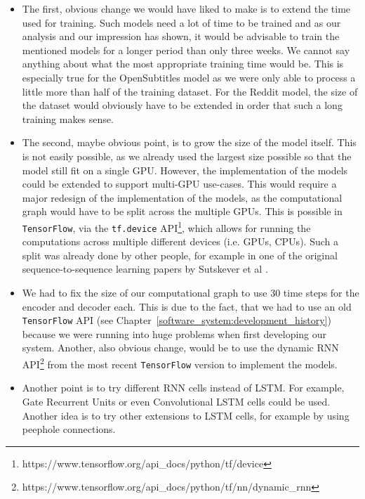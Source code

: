 \begin{itemize}
  \item The first, obvious change we would have liked to make is to extend the time used for training. Such models need a lot of time to be trained and as our analysis and our impression has shown, it would be advisable to train the mentioned models for a longer period than only three weeks. We cannot say anything about what the most appropriate training time would be. This is especially true for the OpenSubtitles model as we were only able to process a little more than half of the training dataset. For the Reddit model, the size of the dataset would obviously have to be extended in order that such a long training makes sense.
  
  \item The second, maybe obvious point, is to grow the size of the model itself. This is not easily possible, as we already used the largest size possible so that the model still fit on a single GPU. However, the implementation of the models could be extended to support multi-GPU use-cases. This would require a major redesign of the implementation of the models, as the computational graph would have to be split across the multiple GPUs. This is possible in \texttt{TensorFlow}, via the \texttt{tf.device} API\footnote{https://www.tensorflow.org/api\_docs/python/tf/device}, which allows for running the computations across multiple different devices (i.e. GPUs, CPUs). Such a split was already done by other people, for example in one of the original sequence-to-sequence learning papers by Sutskever et al \cite{Sutskever:2014}.

  \item We had to fix the size of our computational graph to use 30 time steps for the encoder and decoder each. This is due to the fact, that we had to use an old \texttt{TensorFlow} API (see Chapter~\ref{software_system:development_history}) because we were running into huge problems when first developing our system. Another, also obvious change, would be to use the dynamic RNN API\footnote{https://www.tensorflow.org/api\_docs/python/tf/nn/dynamic\_rnn} from the most recent \texttt{TensorFlow} version to implement the models.
  
  \item Another point is to try different RNN cells instead of LSTM. For example, Gate Recurrent Units \cite{Chung:2014} or even Convolutional LSTM \cite{Xingjian:2015} cells could be used. Another idea is to try other extensions to LSTM cells, for example by using peephole connections.


\end{itemize}
